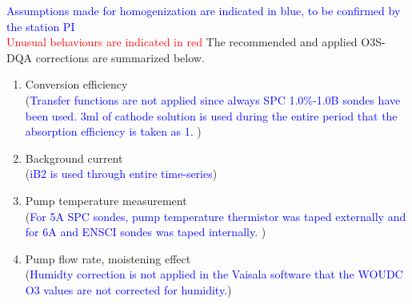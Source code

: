 \documentclass{article}
\begin{document}
\textcolor{blue}{Assumptions made for homogenization are indicated in blue, to be confirmed by the station PI}\\
\textcolor{red}{Unusual behaviours are indicated in red}
%
%
The recommended and applied O3S-DQA corrections are summarized below.\\
    \begin{enumerate}
        \item Conversion efficiency \\
         (\textcolor{blue}{Transfer functions are not applied since always SPC 1.0$\%$-1.0B sondes have been used.
         3ml of cathode solution is used during the entire period that the absorption efficiency is taken as 1.
 })
        \item Background current\\
        (\textcolor{blue}{iB2 is used through entire time-series})\\
        \item Pump temperature measurement\\
        (\textcolor{blue}{For 5A SPC sondes, pump temperature thermistor was taped externally and for 6A and ENSCI sondes
        was taped internally. })\\
        \item Pump flow rate, moistening effect\\
                (\textcolor{blue}{Humidty correction is not applied in the Vaisala software that the WOUDC O3 values are
                not corrected for humidity.})\\


\end{enumerate}
\end{document}
